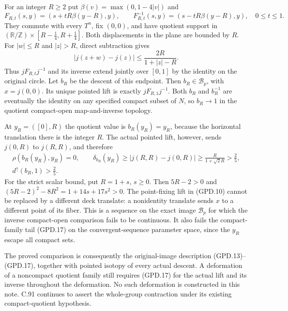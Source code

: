 For an integer $R\geq2$ put
$\beta(v)=\max(0,1-4|v|)$ and
\[
 F_{R,t}(s,y)=(s+tR\beta(y-R),y),\qquad
 F_{R,t}^{-1}(s,y)=(s-tR\beta(y-R),y),
 \quad 0\leq t\leq1 .
                                                               \tag{GPD.19}
\]
They commute with every $T^n$, fix $(0,0)$, and have quotient
support in
$(\mathbb R/\mathbb Z)\times[R-\tfrac14,R+\tfrac14]$.
Both displacements in the plane are bounded by $R$.
For $|w|\leq R$ and $|z|>R$, direct subtraction gives
\[
       |j(z+w)-j(z)|\leq\frac{2R}{1+|z|-R}.
                                                               \tag{GPD.20}
\]
Thus $jF_{R,t}j^{-1}$ and its inverse extend jointly over
$[0,1]$ by the identity on the original circle.
Let $b_R$ be the descent of this endpoint.
Then $b_R\in\mathscr B_p$, with $x=j(0,0)$.
Its unique pointed lift is exactly $jF_{R,1}j^{-1}$.
Both $b_R$ and $b_R^{-1}$ are eventually the identity
on any specified compact subset of $N$, so $b_R\to1$
in the quotient compact-open map-and-inverse topology.

At $y_R=([0],R)$ the quotient value is $b_R(y_R)=y_R$,
because the horizontal translation there is the integer $R$.
The actual pointed lift, however, sends
$j(0,R)$ to $j(R,R)$, and therefore
\[
 \begin{gathered}
 \rho(b_R(y_R),y_R)=0,\qquad
 \delta_{b_R}(y_R)\geq
       |j(R,R)-j(0,R)|\geq\frac{R}{1+\sqrt2R}>\frac25,\\
 d^\uparrow(b_R,1)>\frac25 .
 \end{gathered}                                                \tag{GPD.21}
\]
For the strict scalar bound, put $R=1+s$, $s\geq0$.
Then $5R-2>0$ and
$(5R-2)^2-8R^2=1+14s+17s^2>0$.
The point-fixing lift in (GPD.10) cannot be replaced by a
different deck translate: a nonidentity translate sends $x$
to a different point of its fiber.
This is a sequence on the exact image $\mathscr B_p$ for
which the inverse compact-open comparison fails to be continuous.
It also fails the compact-family tail (GPD.17) on the
convergent-sequence parameter space, since the $y_R$ escape
all compact sets.

The proved comparison is consequently the original-image
description (GPD.13)--(GPD.17), together with pointed isotopy
of every actual descent. A deformation of a noncompact
quotient family still requires (GPD.17) for the actual
lift and its inverse throughout the deformation.
No such deformation is constructed in this note.
C.91 continues to assert the whole-group contraction under
its existing compact-quotient hypothesis.
